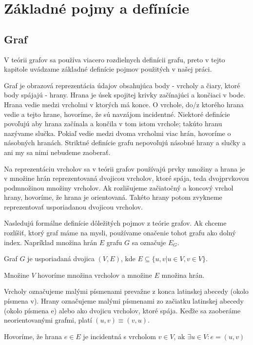 \chapter{Základné pojmy a defínície}
\thispagestyle{empty}


\section{Graf}
V teórii grafov sa používa viacero rozdielnych definícii grafu, preto v
tejto kapitole uvádzame základné definície pojmov použitých v našej práci.

Graf je obrazová reprezentácia údajov obsahujúca body - vrcholy a čiary,
ktoré body spájajú - hrany. Hrana je úsek spojitej krivky začínajúci a 
končiaci v bode. Hrana vedie medzi vrcholmi v ktorých má konce.
O vrchole, do/z ktorého hrana vedie a tejto hrane, hovoríme, 
že sú navzájom incidentné. Niektoré definície povoľujú aby hrana začínala a 
končila v tom istom vrchole; takúto hranu nazývame slučka. 
Pokiaľ vedie medzi dvoma vrcholmi viac hrán, hovoríme o násobných hranách. 
Striktné definície grafu nepovoľujú násobné hrany a slučky a ani my sa nimi 
nebudeme zaoberať.

Na reprezentáciu vrcholov sa v teórii grafov používajú prvky množiny a 
hrana je v množine 
hrán reprezentovaná dvojicou vrcholov, ktoré spája, teda dvojprvkovou
podmnožinou množiny vrcholov. Ak rozlišujeme začiatočný a koncový vrchol
hrany, hovoríme, že hrana je orientovaná. Takéto hrany potom zvykneme
reprezentovať usporiadanou dvojicou vrcholov.

Nasledujú formálne definície dôležitých pojmov z teórie grafov. Ak chceme
rozlíšiť, ktorý graf máme na mysli, používame onačenie tohot grafu ako dolný
index. Napríklad množina hrán $E$ grafu $G$ sa označuje $E_{G}$.

\begin{defin}
Graf $G$ je usporiadaná dvojica $(V,E)$, kde
$E \subseteq \{u,v | u \in V, v \in V\}$.

Množine $V$ hovoríme množina vrcholov a množine $E$ množina hrán.

Vrcholy označujeme malými písmenami prevažne z konca latinskej abecedy 
(okolo písmena v). Hrany označujeme malými písmenami zo začiatku latinskej 
abecedy (okolo písmena e) alebo ako dvojicu vrcholov, ktoré spája. Keďže sa
zaoberáme neorientovanými grafmi, platí
$(u,v) \equiv (v,u)$.
\end{defin}

\begin{defin}
Hovoríme, že hrana $e \in E$ je incidentná s vrcholom $v \in V$, ak
$\exists  u \in  V : e = (u,v) $
\end{defin}

